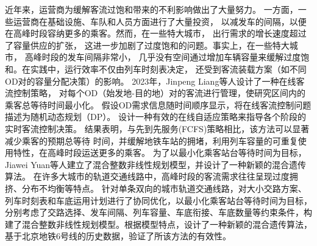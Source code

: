 近年来，运营商为缓解客流过饱和带来的不利影响做出了大量努力。
一方面，一些运营商在基础设施、车队和人员方面进行了大量投资，
以减发车的间隔，以便在高峰时段容纳更多的乘客。然而，在一些特大城市，
出行需求的增长速度超过了容量供应的扩张，
这进一步加剧了过度饱和的问题。事实上，在一些特大城市，
高峰时段的发车间隔非常小，
几乎没有空间通过增加车辆容量来缓解过度饱和。在实践中，运行效率不仅由列车时刻表决定，
还受到客流装载方案（如不同OD对的容量分配决策\cite{CHIERICI200499}）的影响。
2023年，Jinpeng Liang等人设计了一种在线客流控制策略\cite{LIANG2023102845}，
对每个OD（始发地-目的地）对的客流进行管理，使研究区间内的乘客总等待时间最小化。
假设OD需求信息随时间顺序显示，将在线客流控制问题描述为随机动态规划（DP）。
设计一种有效的在线自适应策略来指导各个阶段的实时客流控制决策。
结果表明，与先到先服务(FCFS)策略相比，该方法可以显著减少乘客的预期总等待
时间，并缓解地铁车站的拥堵，利用列车容量的可重复使用特性，在高峰时段运送更多的乘客。
为了以最小化乘客站台等待时间为目标， Jiawei Yuan等人建立了混合整数非线性规划模型，并设计了一种新颖的混合遗传算法\cite{YUAN2022855}。
在许多大城市的轨道交通线路中，高峰时段的客流需求往往呈现过度拥挤、分布不均衡等特点。
针对单条双向的城市轨道交通线路，对大小交路方案、列车时刻表和车底运用计划进行了协同优化，以最小化乘客站台等待时间为目标，
分别考虑了交路选择、发车间隔、列车容量、车底衔接、车底数量等约束条件，构建了混合整数非线性规划模型。根据模型特点，设计了一种新颖的混合遗传算法，
基于北京地铁6号线的历史数据，验证了所该方法的有效性。


